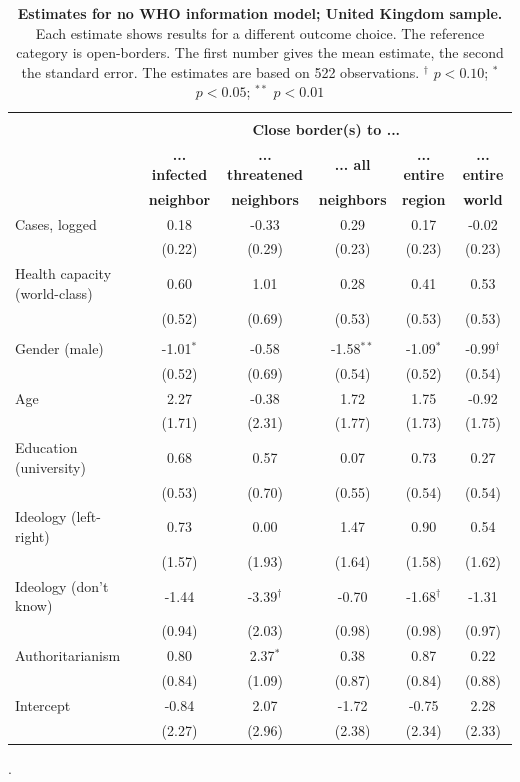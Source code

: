 \begin{table}[ht!]
\begin{center}
\footnotesize
\renewcommand{\arraystretch}{1.05}
\begin{tabular}{@{\extracolsep{4.8pt}}lccccc} 
\\[-1.8ex]\hline \\[-1.8ex]
 & \multicolumn{5}{c}{\normalsize{\textbf{Close border(s) to ...}}}
\\
  & \small{\textbf{... infected}} & \small{\textbf{... threatened}} & \small{\textbf{... all}} & \small{\textbf{... entire }} & \small{\textbf{... entire}}
 \\
  & \small{\textbf{neighbor}} & \small{\textbf{neighbors}} & \small{\textbf{neighbors}} & \small{\textbf{region}} & \small{\textbf{world}}
 \\
\hline
Cases, logged & 0.18 & -0.33 & 0.29 & 0.17 & -0.02\\
 & (0.22) & (0.29) & (0.23) & (0.23) & (0.23)\\
Health capacity (world-class) & 0.60 & 1.01 & 0.28 & 0.41 & 0.53\\
 & (0.52) & (0.69) & (0.53) & (0.53) & (0.53)\\
\\
Gender (male) & -1.01$^{*}$ & -0.58 & -1.58$^{**}$ & -1.09$^{*}$ & -0.99$^{\dag}$\\
 & (0.52) & (0.69) & (0.54) & (0.52) & (0.54)\\
Age & 2.27 & -0.38 & 1.72 & 1.75 & -0.92\\
 & (1.71) & (2.31) & (1.77) & (1.73) & (1.75)\\
Education (university) & 0.68 & 0.57 & 0.07 & 0.73 & 0.27\\
 & (0.53) & (0.70) & (0.55) & (0.54) & (0.54)\\
Ideology (left-right) & 0.73 & 0.00 & 1.47 & 0.90 & 0.54\\
 & (1.57) & (1.93) & (1.64) & (1.58) & (1.62)\\
Ideology (don't know) & -1.44 & -3.39$^{\dag}$ & -0.70 & -1.68$^{\dag}$ & -1.31\\
 & (0.94) & (2.03) & (0.98) & (0.98) & (0.97)\\
Authoritarianism & 0.80 & 2.37$^{*}$ & 0.38 & 0.87 & 0.22\\
 & (0.84) & (1.09) & (0.87) & (0.84) & (0.88)\\
Intercept & -0.84 & 2.07 & -1.72 & -0.75 & 2.28\\
 & (2.27) & (2.96) & (2.38) & (2.34) & (2.33)\\
\hline
\hline
\end{tabular}
\caption{\textbf{Estimates for no WHO information model; United Kingdom sample.} Each estimate shows results for a different outcome choice. The reference category is open-borders. The first number gives the mean estimate, 
                the second the standard error. The estimates are based on 522 observations. $^{\dag}$ $p < 0.10$; $^{*}$ $p < 0.05$; $^{**}$ $p < 0.01$}.
\label{Tab:MainUK_2}
\end{center}
\end{table}
